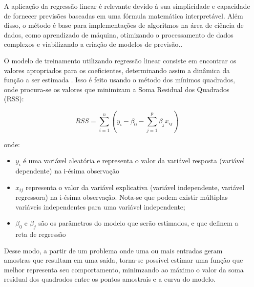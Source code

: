 A aplicação da regressão linear é relevante devido à sua simplicidade e capacidade de fornecer previsões baseadas em uma fórmula matemática interpretável. Além disso, o método é base para implementações de algoritmos na área de ciência de dados, como aprendizado de máquina, otimizando o processamento de dados complexos e viabilizando a criação de modelos de previsão.\cite{aws2024}.

O modelo de treinamento utilizando regressão linear consiste em  encontrar os valores apropriados para os coeficientes, determinando assim a dinâmica da função a ser estimada \cite{soczi2024}. Isso é feito usando o método dos mínimos quadrados, onde procura-se os valores que minimizam a Soma Residual dos Quadrados (RSS):

\begin{equation}
    RSS = \sum_{i=1}^{n} \left(y_i - \beta_0 - \sum_{j=1}^{p}\beta_jx_{ij}\right)
\end{equation}

onde:

\begin{itemize}
    \item $y_i$ é uma variável aleatória e representa o valor da variável resposta (variável dependente) na i-ésima observação
    \item $x_{ij}$ representa o valor da variável explicativa (variável independente, variável regressora) na i-ésima observação. Nota-se que podem existir múltiplas variáveis independentes para uma variável independente; 
    \item $\beta_{0}$ e $\beta_{j}$ são os parâmetros do modelo que serão estimados, e que definem a reta de regressão
\end{itemize}

Desse modo, a partir de um problema onde uma ou mais entradas geram amostras que resultam em uma saída, torna-se possível estimar uma função que melhor representa seu comportamento, minimzando ao máximo o valor da soma residual dos quadrados entre os pontos amostrais e a curva do modelo. 

